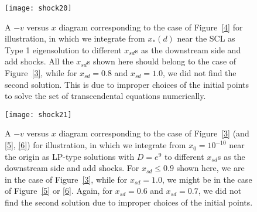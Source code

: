 \documentclass[fleqn,usenatbib]{mnras}
\begin{document}
\begin{figure}
\centering
\texttt{[image: shock20]}
\caption{A $-v$ versus $x$ diagram corresponding to the case of Figure~\ref{4} for illustration, in which we integrate from $x_{*}(d)$ near the SCL as Type 1 eigensolution to different $x_{sd}$s as the downstream side and add shocks. All the $x_{sd}$s shown here should belong to the case of Figure~\ref{3}, while for $x_{sd}=0.8$ and $x_{sd}=1.0$, we did not find the second solution. This is due to improper choices of the initial points to solve the set of transcendental equations numerically.}
\label{7}
\end{figure}

\begin{figure}
\centering
\texttt{[image: shock21]}
\caption{A $-v$ versus $x$ diagram corresponding to the case of Figure~\ref{3} (and \ref{5}, \ref{6}) for illustration, in which we integrate from $x_{0}=10^{-10}$ near the origin as LP-type solutions with $D=e^{9}$ to different $x_{sd}$s as the downstream side and add shocks. For $x_{sd}\leq 0.9$ shown here, we are in the case of Figure~\ref{3}, while for $x_{sd}=1.0$, we might be in the case of Figure~\ref{5} or \ref{6}. Again, for $x_{sd}=0.6$ and $x_{sd}=0.7$, we did not find the second solution due to improper choices of the initial points.}
\label{8}
\end{figure}


 

\label{lastpage}
\end{document}

